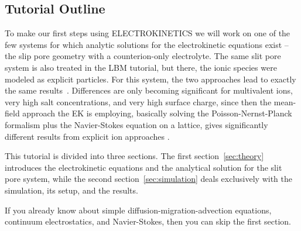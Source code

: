 \subsection*{Tutorial Outline}

To make our first steps using ELECTROKINETICS we will work on one of the few systems for which analytic solutions for the electrokinetic equations exist -- the slip pore geometry with a counterion-only electrolyte. The same slit pore system is also treated in the LBM tutorial, but there, the ionic species were modeled as explicit particles. For this system, the two approaches lead to exactly the same results~\cite{rempfer10a}. Differences are only becoming significant for multivalent ions, very high salt concentrations, and very high surface charge, since then the mean-field approach the EK is employing, basically solving the Poisson-Nernst-Planck formalism plus the Navier-Stokes equation on a lattice, gives significantly different results from explicit ion approaches \cite{deserno00a,holm01a,deserno01c}.

This tutorial is divided into three sections. The first section~\ref{sec:theory} introduces the electrokinetic equations and the analytical solution for the slit pore system, while the second section~\ref{sec:simulation} deals exclusively with the simulation, its setup, and the results.

If you already know about simple diffusion-migration-advection equations, continuum electrostatics, and Navier-Stokes, then you can skip the first section.

\pagebreak
